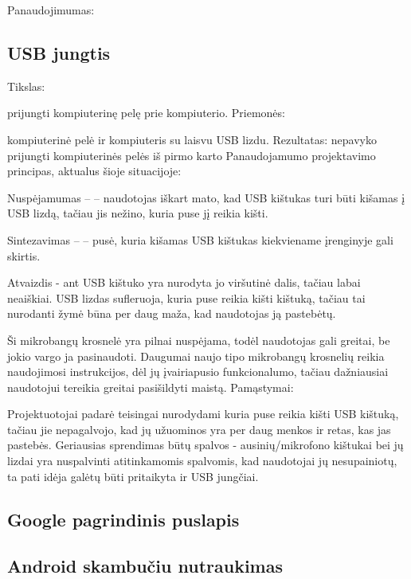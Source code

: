 ﻿\documentclass[a4paper, 12pt]{article}
\newcommand{\placeholder}{\textbf{\textsf{\textcolor{red}{\fbox{PLACEHOLDER}}}}}
\begin{document}
		Panaudojimumas:\newline
		
		
	\subsection{USB jungtis}
		Tikslas:
		
		prijungti kompiuterinę pelę prie kompiuterio.\newline 	
		Priemonės: 
		
		kompiuterinė pelė ir kompiuteris su laisvu USB lizdu.\newline 		
		Rezultatas:
		nepavyko prijungti kompiuterinės pelės iš pirmo karto\newline 	
		Panaudojamumo projektavimo principas, aktualus šioje situacijoje:
		
		Nuspėjamumas – – naudotojas iškart mato, kad USB kištukas turi būti kišamas į USB lizdą, tačiau jis nežino, kuria puse jį reikia kišti.
			
		Sintezavimas – – pusė, kuria kišamas USB kištukas kiekviename įrenginyje gali skirtis.
			
		Atvaizdis - ant USB kištuko yra nurodyta jo viršutinė dalis, tačiau labai neaiškiai. USB lizdas sufleruoja, kuria puse reikia kišti kištuką, tačiau tai nurodanti žymė būna per daug maža, kad naudotojas ją pastebėtų.
			
		Ši mikrobangų krosnelė yra pilnai nuspėjama, todėl naudotojas gali greitai, be jokio vargo ja pasinaudoti. Daugumai naujo tipo mikrobangų krosnelių reikia naudojimosi instrukcijos, dėl jų įvairiapusio funkcionalumo, tačiau dažniausiai naudotojui tereikia greitai pasišildyti maistą.\newline
		Pamąstymai:
		
		Projektuotojai padarė teisingai nurodydami kuria puse reikia kišti USB kištuką, tačiau jie nepagalvojo, kad jų užuominos yra per daug menkos ir retas, kas jas pastebės. Geriausias sprendimas būtų spalvos - ausinių/mikrofono kištukai bei jų lizdai yra nuspalvinti atitinkamomis spalvomis, kad naudotojai jų nesupainiotų, ta pati idėja galėtų būti pritaikyta ir USB jungčiai.	
	\subsection{Google pagrindinis puslapis}
		\placeholder
	\subsection{Android skambučiu nutraukimas}
		\placeholder
\end{document}

